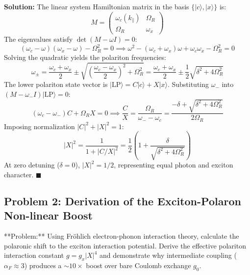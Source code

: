 \documentclass[11pt,oneside]{article}
\begin{document}
\textbf{Solution:}
The linear system Hamiltonian matrix in the basis $\{|c\rangle, |x\rangle\}$ is:
\begin{equation}
M = \begin{pmatrix} \omega_c(k_\parallel) & \Omega_R \\ \Omega_R & \omega_x \end{pmatrix}
\end{equation}
The eigenvalues satisfy $\det(M - \omega I) = 0$:
\begin{equation}
(\omega_c - \omega)(\omega_x - \omega) - \Omega_R^2 = 0 \implies \omega^2 - (\omega_c + \omega_x)\omega + \omega_c \omega_x - \Omega_R^2 = 0
\end{equation}
Solving the quadratic yields the polariton frequencies:
\begin{equation}
\omega_\pm = \frac{\omega_c + \omega_x}{2} \pm \sqrt{\left(\frac{\omega_c - \omega_x}{2}\right)^2 + \Omega_R^2} = \frac{\omega_c + \omega_x}{2} \pm \frac{1}{2}\sqrt{\delta^2 + 4\Omega_R^2}
\end{equation}
The lower polariton state vector is $|\text{LP}\rangle = C |c\rangle + X |x\rangle$. Substituting $\omega_-$ into $(M - \omega_- I) |\text{LP}\rangle = 0$:
\begin{equation}
(\omega_c - \omega_-) C + \Omega_R X = 0 \implies \frac{C}{X} = \frac{\Omega_R}{\omega_- - \omega_c} = \frac{-\delta + \sqrt{\delta^2 + 4\Omega_R^2}}{2\Omega_R}
\end{equation}
Imposing normalization $|C|^2 + |X|^2 = 1$:
\begin{equation}
|X|^2 = \frac{1}{1 + |C/X|^2} = \frac{1}{2}\left(1 + \frac{\delta}{\sqrt{\delta^2 + 4\Omega_R^2}}\right)
\end{equation}
At zero detuning ($\delta = 0$), $|X|^2 = 1/2$, representing equal photon and exciton character. $\blacksquare$



\subsection{Problem 2: Derivation of the Exciton-Polaron Non-linear Boost}
\begin{problembox}
**Problem:** Using Fröhlich electron-phonon interaction theory, calculate the polaronic shift to the exciton interaction potential. Derive the effective polariton interaction constant $g = g_x |X|^4$ and demonstrate why intermediate coupling ($\alpha_F \approx 3$) produces a $\sim 10\times$ boost over bare Coulomb exchange $g_0$.
\end{problembox}
\end{document}

